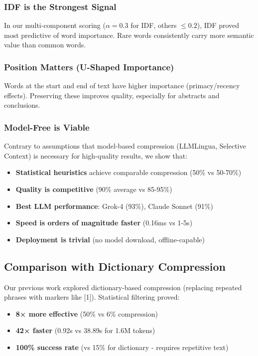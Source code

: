 \subsubsection{IDF is the Strongest Signal}

In our multi-component scoring ($\alpha = 0.3$ for IDF, others $\leq 0.2$), IDF proved most predictive of word importance. Rare words consistently carry more semantic value than common words.

\subsubsection{Position Matters (U-Shaped Importance)}

Words at the start and end of text have higher importance (primacy/recency effects). Preserving these improves quality, especially for abstracts and conclusions.

\subsubsection{Model-Free is Viable}

Contrary to assumptions that model-based compression (LLMLingua, Selective Context) is necessary for high-quality results, we show that:
\begin{itemize}
    \item \textbf{Statistical heuristics} achieve comparable compression (50\% vs 50-70\%)
    \item \textbf{Quality is competitive} (90\% average vs 85-95\%)
    \item \textbf{Best LLM performance}: Grok-4 (93\%), Claude Sonnet (91\%)
    \item \textbf{Speed is orders of magnitude faster} (0.16ms vs 1-5s)
    \item \textbf{Deployment is trivial} (no model download, offline-capable)
\end{itemize}

\subsection{Comparison with Dictionary Compression}

Our previous work explored dictionary-based compression (replacing repeated phrases with markers like [1]). Statistical filtering proved:

\begin{itemize}
    \item \textbf{8× more effective} (50\% vs 6\% compression)
    \item \textbf{42× faster} (0.92s vs 38.89s for 1.6M tokens)
    \item \textbf{100\% success rate} (vs 15\% for dictionary - requires repetitive text)
\end{itemize}

